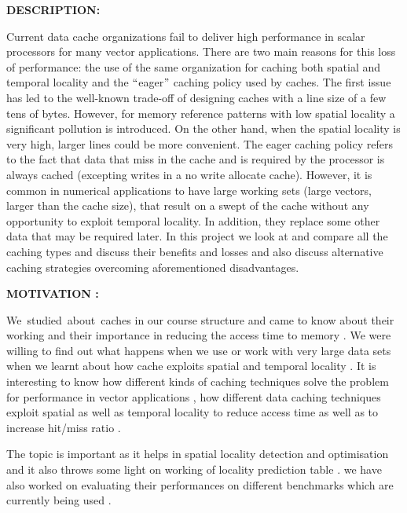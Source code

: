 \documentclass[12pt]{article}
\begin{document}
{\fontsize{16pt}{19.2pt}\selectfont \textbf{DESCRIPTION:}\par}\par

 Current data cache organizations fail to deliver high performance in scalar processors for many vector applications. There are two main reasons for this loss of performance: the use of the same organization for caching both spatial and temporal locality and the $``$eager$"$  caching policy used by caches. The first issue has led to the well-known trade-off of designing caches with a line size of a few tens of bytes. However, for memory reference patterns with low spatial locality a significant pollution is introduced. On the other hand, when the spatial locality is very high, larger lines could be more convenient. The eager caching policy refers to the fact that data that miss in the cache and is required by the processor is always cached (excepting writes in a no write allocate cache). However, it is common in numerical applications to have large working sets (large vectors, larger than the cache size), that result on a swept of the cache without any opportunity to exploit temporal locality. In addition, they replace some other data that may be required later. In this project we look at and compare all the caching types and discuss their benefits and losses and also discuss alternative caching strategies overcoming aforementioned disadvantages.\par

{\fontsize{16pt}{19.2pt}\selectfont \textbf{MOTIVATION :}\par}\par

We\ studied\ about\ caches in our course structure and came to know about their working and their importance in reducing the access time to  memory . We were willing to find out what happens when we use or work with very large data sets when  we learnt about how cache exploits spatial and temporal locality . It is interesting to know  how different kinds of caching techniques solve the problem for performance in vector applications , how different data caching techniques exploit spatial as well as temporal locality to reduce access time as well as to increase hit/miss ratio .\par

The topic is important as it helps in spatial locality detection and optimisation and it also throws some light on working of locality prediction table . we have also worked on evaluating their performances on different benchmarks which are currently being used .\par
\end{document}
